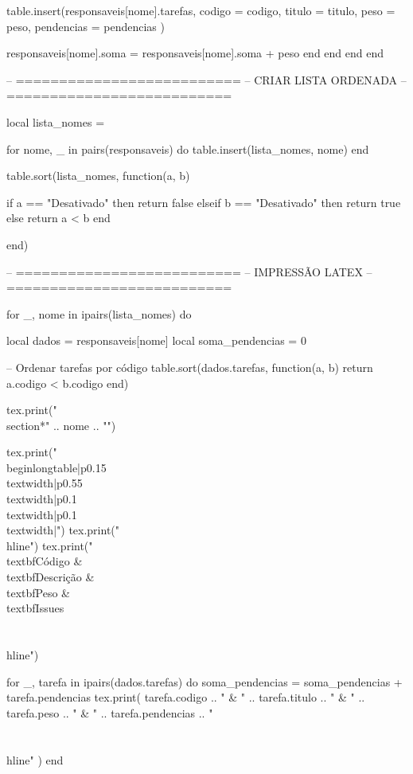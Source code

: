 \begin{luacode*}
          table.insert(responsaveis[nome].tarefas, {
            codigo = codigo,
            titulo = titulo,
            peso   = peso,
            pendencias = pendencias
          })

          responsaveis[nome].soma =
            responsaveis[nome].soma + peso
        end
      end
    end
  end

  -- ==========================
  -- CRIAR LISTA ORDENADA
  -- ==========================

  local lista_nomes = {}

  for nome, _ in pairs(responsaveis) do
    table.insert(lista_nomes, nome)
  end

  table.sort(lista_nomes, function(a, b)

    if a == "Desativado" then
      return false
    elseif b == "Desativado" then
      return true
    else
      return a < b
    end

  end)

  -- ==========================
  -- IMPRESSÃO LATEX
  -- ==========================

  for _, nome in ipairs(lista_nomes) do

    local dados = responsaveis[nome]
    local soma_pendencias = 0

    -- Ordenar tarefas por código
    table.sort(dados.tarefas, function(a, b)
      return a.codigo < b.codigo
    end)

    tex.print("\\section*{" .. nome .. "}")

    tex.print("\\begin{longtable}{|p{0.15\\textwidth}|p{0.55\\textwidth}|p{0.1\\textwidth}|p{0.1\\textwidth}|}")
    tex.print("\\hline")
    tex.print("\\textbf{Código} & \\textbf{Descrição} & \\textbf{Peso} & \\textbf{Issues} \\\\ \\hline")
  
    for _, tarefa in ipairs(dados.tarefas) do
      soma_pendencias = soma_pendencias + tarefa.pendencias
      tex.print(
        tarefa.codigo .. " & " ..
        tarefa.titulo .. " & " ..
        tarefa.peso .. " & " ..
        tarefa.pendencias .. " \\\\ \\hline"
      )
    end


\end{luacode*}

